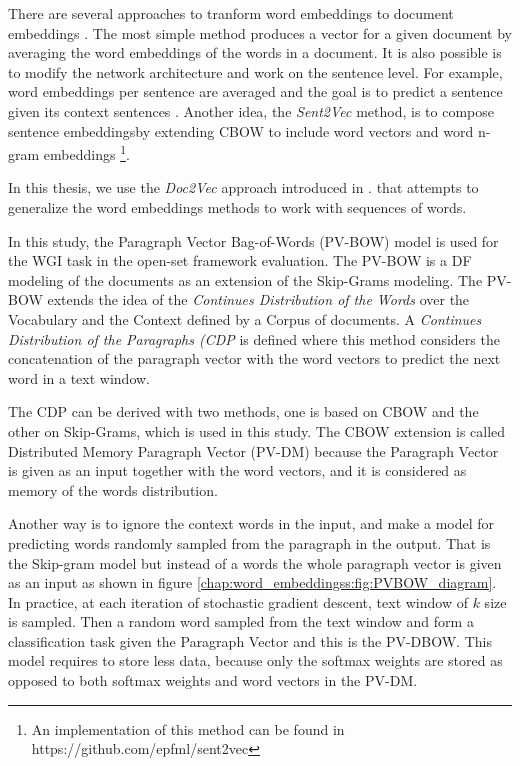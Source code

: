 There are several approaches to tranform word embeddings to document embeddings \parencite{mitra2018introduction,mikolov2013distributed}. The most simple method produces a vector for a given document by averaging the word embeddings of the words in a document. It is also possible is to modify the network architecture and work on the sentence level. For example, word embeddings per sentence are averaged and the goal is to predict a sentence given its context sentences . Another idea, the \textit{Sent2Vec} method, is to compose sentence embeddingsby extending CBOW to include word vectors and word n-gram embeddings \footnote{An implementation of this method can be found in https://github.com/epfml/sent2vec}.

In this thesis, we use the \textit{Doc2Vec} approach introduced in . that attempts to generalize the word embeddings methods to work with sequences of words. 


In this study, the Paragraph Vector Bag-of-Words (PV-BOW) model is used for the WGI task in the open-set framework evaluation. The PV-BOW is a DF modeling of the documents as an extension of the Skip-Grams modeling. The PV-BOW extends the idea of the \textit{Continues Distribution of the Words} over the Vocabulary and the Context defined by a Corpus of documents. A \textit{Continues Distribution of the Paragraphs (CDP} is defined where this method considers the concatenation of the paragraph vector with the word vectors to predict the next word in a text window. 
 
The CDP can be derived with two methods, one is based on CBOW and the other on Skip-Grams, which is used in this study. The CBOW extension is called Distributed Memory Paragraph Vector (PV-DM) because the Paragraph Vector is given as an input together with the word vectors, and it is considered as memory of the words distribution.
 
Another way is to ignore the context words in the input, and make a model for predicting words randomly sampled from the paragraph in the output. That is the Skip-gram model but instead of a words the whole paragraph vector is given as an input as shown in figure \ref{chap:word_embeddingss:fig:PVBOW_diagram}. In practice, at each iteration of stochastic gradient descent, text window of $k$ size is sampled. Then a random word sampled from the text window and form a classification task given the Paragraph Vector and  this is the PV-DBOW. This model requires to store less data, because only the softmax weights are stored as opposed to both softmax weights and word vectors in the PV-DM. 

